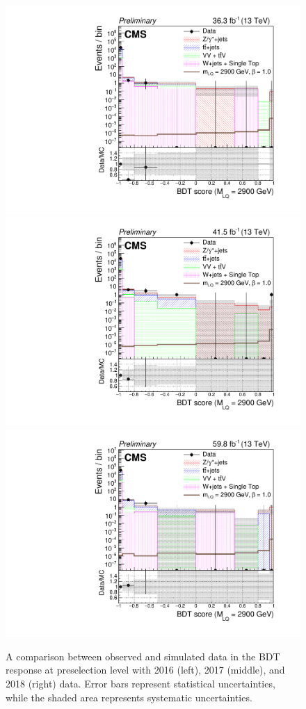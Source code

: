 \begin{figure}[H]
    {\includegraphics[width=.32\textwidth]{Images/Analysis/Results_2016_Unblinded/Plots/Preselection/BasicLQ_uujj_LQToBMu_pair_uubj_BDT_discrim_M2900_standard.pdf}}
    {\includegraphics[width=.32\textwidth]{Images/Analysis/Results_2017_Unblinded/Plots/Preselection/BasicLQ_uujj_LQToBMu_pair_uubj_BDT_discrim_M2900_standard.pdf}}
    {\includegraphics[width=.32\textwidth]{Images/Analysis/Results_2018_Unblinded/Plots/Preselection/BasicLQ_uujj_LQToBMu_pair_uubj_BDT_discrim_M2900_standard.pdf}}
    \caption{A comparison between observed and simulated data in the BDT response at preselection level with 2016 (left), 2017 (middle), and 2018 (right) data. Error bars represent statistical uncertainties, while the shaded area represents systematic uncertainties.}
    \label{figapp:BDT2700to2900}
\end{figure}

